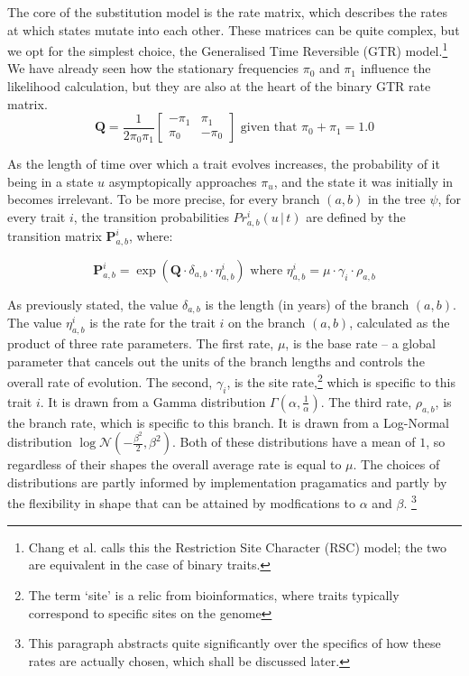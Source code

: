 \documentclass[10pt,journal,compsoc]{IEEEtran}
\begin{document}
The core of the substitution model is the rate matrix, which describes the rates at which states mutate into each other. These matrices can be quite complex, but we opt for the simplest choice, the Generalised Time Reversible (GTR) model.\footnote{Chang et al. calls this the Restriction Site Character (RSC) model; the two are equivalent in the case of binary traits.} We have already seen how the stationary frequencies $\pi_0$ and $\pi_1$ influence the likelihood calculation, but they are also at the heart of the binary GTR rate matrix. 
\begin{equation}\label{eqn:ratematrix}
\textbf{Q} = \frac{1}{2\pi_0\pi_1} \begin{bmatrix}
-\pi_1 & \pi_1\\
\pi_0 & -\pi_0
\end{bmatrix} \text{ \ given that \ } \pi_0 + \pi_1 = 1.0
\end{equation}

As the length of time over which a trait evolves increases, the probability of it being in a state $u$ asymptopically approaches $\pi_u$, and the state it was initially in becomes irrelevant. To be more precise, for every branch $(a, b)$ in the tree $\psi$, for every trait $i$, the transition probabilities $Pr^i_{a,b}\left(u\,\vert\,t\right)$ are defined by the transition matrix $\textbf{P}^i_{a,b}$, where:

\begin{equation}\label{eqn:rate}
\textbf{P}^i_{a,b} = \exp\left(\textbf{Q} \cdot \delta_{a,b} \cdot \eta^i_{a,b}\right) \text{  \ where  \  } \eta^i_{a,b} = \mu \cdot \gamma_i \cdot \rho_{a,b}
\end{equation}

As previously stated, the value $\delta_{a,b}$ is the length (in years) of the branch $(a, b)$. The value $\eta^i_{a,b}$ is the rate for the trait $i$ on the branch $(a, b)$, calculated as the product of three rate parameters. The first rate,  $\mu$, is the base rate -- a global parameter that cancels out the units of the branch lengths and controls the overall rate of evolution. The second, $\gamma_i$, is the site rate,\footnote{The term `site' is a relic from bioinformatics, where traits typically correspond to specific sites on the genome} which is specific to this trait $i$. It is drawn from a Gamma distribution $\Gamma(\alpha, \frac{1}{\alpha})$. The third rate, $\rho_{a,b}$, is the branch rate, which is specific to this branch. It is drawn from a Log-Normal distribution $\log \mathcal{N}(-\frac{\beta^2}{2}, \beta^2)$. Both of these distributions have a mean of $1$, so regardless of their shapes the overall average rate is equal to $\mu$. The choices of distributions are partly informed by implementation pragamatics and partly by the flexibility in shape that can be attained by modfications to $\alpha$ and $\beta$. \footnote{This paragraph abstracts quite significantly over the specifics of how these rates are actually chosen, which shall be discussed later.}
\end{document}

